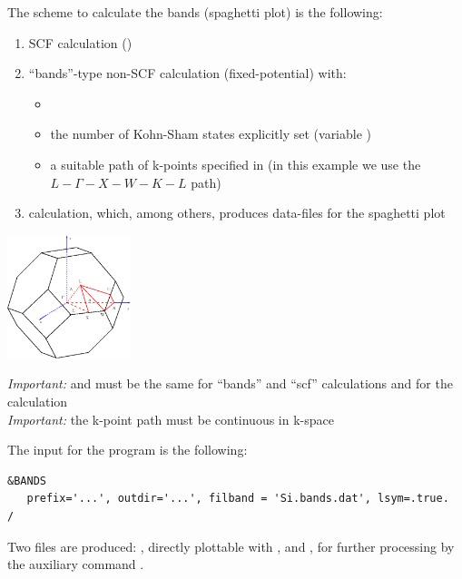 \documentclass[landscape]{foils}
\begin{document}
%
The scheme to calculate the bands (spaghetti plot) is the following:
\parbox{0.7\textwidth}{
  \begin{enumerate}
  \item SCF  calculation ()
  \item ``bands''-type non-SCF  calculation
    (fixed-potential) with:
    \begin{itemize}
    \item {}
    \item the number of Kohn-Sham states explicitly set (variable
      )
    \item a suitable path of k-points specified in  (in
      this example we use the $L-\Gamma-X-W-K-L$ path)
    \end{itemize}
  \item {} calculation, which, among others, produces
    data-files for the spaghetti plot
  \end{enumerate}
}\parbox{0.3\textwidth}{
 \begin{flushright}
    \includegraphics[width=0.27\textwidth]{figs/fcc_brillouin.pdf}
  \end{flushright}
}

{\em Important:}  and  must be the same for
``bands'' and ``scf''  calculations and for
the  calculation\\
{\em Important:} the k-point path must be continuous in k-space

%
The input for the  program is the following:
{\codecolor
\begin{verbatim}
&BANDS
   prefix='...', outdir='...', filband = 'Si.bands.dat', lsym=.true.
/
\end{verbatim}
}
%
Two files are produced: , directly plottable
with , and , for further processing
by the auxiliary command .
\end{document}
